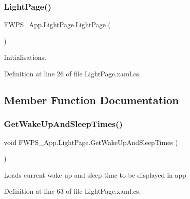 \subsubsection{\texorpdfstring{Light\+Page()}{LightPage()}}
{\footnotesize\ttfamily F\+W\+P\+S\+\_\+\+App.\+Light\+Page.\+Light\+Page (\begin{DoxyParamCaption}{ }\end{DoxyParamCaption})}



Initialisations. 



Definition at line 26 of file Light\+Page.\+xaml.\+cs.



\subsection{Member Function Documentation}
\mbox{\label{class_f_w_p_s___app_1_1_light_page_a37f6598ccd0bc239cf848fca9385a083}} 
\subsubsection{\texorpdfstring{Get\+Wake\+Up\+And\+Sleep\+Times()}{GetWakeUpAndSleepTimes()}}
{\footnotesize\ttfamily void F\+W\+P\+S\+\_\+\+App.\+Light\+Page.\+Get\+Wake\+Up\+And\+Sleep\+Times (\begin{DoxyParamCaption}{ }\end{DoxyParamCaption})\hspace{0.3cm}{\ttfamily [private]}}

Loads current wake up and sleep time to be displayed in app 

Definition at line 63 of file Light\+Page.\+xaml.\+cs.

\mbox{\label{class_f_w_p_s___app_1_1_light_page_ada307c2038d1eda07106e8eaed3604e9}} 
